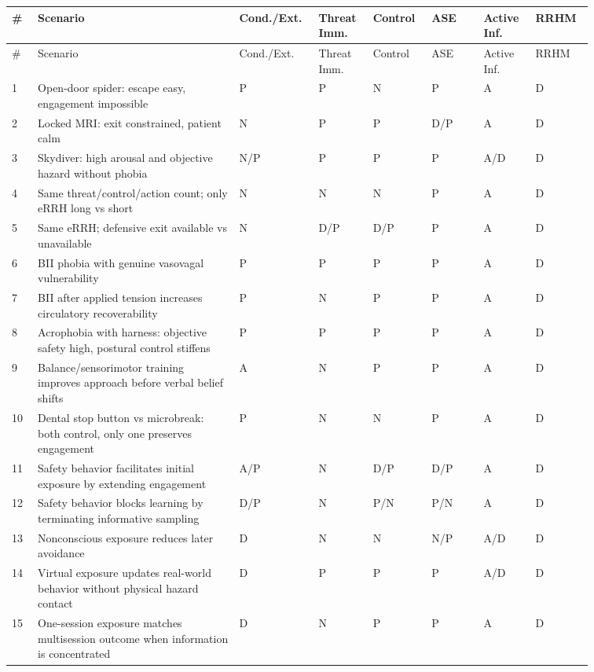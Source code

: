 \documentclass[10pt]{article}
\begin{document}
\begin{landscape}
\scriptsize
\begin{longtable}{p{0.045\linewidth}p{0.31\linewidth}p{0.085\linewidth}p{0.085\linewidth}p{0.085\linewidth}p{0.085\linewidth}p{0.085\linewidth}p{0.085\linewidth}}
\toprule
\# & Scenario & Cond./Ext. & Threat Imm. & Control & ASE & Active Inf. & RRHM \\
\midrule
\endfirsthead
\toprule
\# & Scenario & Cond./Ext. & Threat Imm. & Control & ASE & Active Inf. & RRHM \\
\midrule
\endhead
1 & Open-door spider: escape easy, engagement impossible & P & P & N & P & A & D \\
2 & Locked MRI: exit constrained, patient calm & N & P & P & D/P & A & D \\
3 & Skydiver: high arousal and objective hazard without phobia & N/P & P & P & P & A/D & D \\
4 & Same threat/control/action count; only eRRH long vs short & N & N & N & P & A & D \\
5 & Same eRRH; defensive exit available vs unavailable & N & D/P & D/P & P & A & D \\
6 & BII phobia with genuine vasovagal vulnerability & P & P & P & P & A & D \\
7 & BII after applied tension increases circulatory recoverability & P & N & P & P & A & D \\
8 & Acrophobia with harness: objective safety high, postural control stiffens & P & P & P & P & A & D \\
9 & Balance/sensorimotor training improves approach before verbal belief shifts & A & N & P & P & A & D \\
10 & Dental stop button vs microbreak: both control, only one preserves engagement & P & N & N & P & A & D \\
11 & Safety behavior facilitates initial exposure by extending engagement & A/P & N & D/P & D/P & A & D \\
12 & Safety behavior blocks learning by terminating informative sampling & D/P & N & P/N & P/N & A & D \\
13 & Nonconscious exposure reduces later avoidance & D & N & N & N/P & A/D & D \\
14 & Virtual exposure updates real-world behavior without physical hazard contact & D & P & P & P & A/D & D \\
15 & One-session exposure matches multisession outcome when information is concentrated & D & N & P & P & A & D \\

\end{longtable}
\end{landscape}
\end{document}
